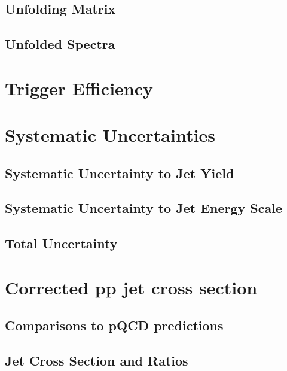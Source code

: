 \subsection{Unfolding Matrix}

\subsection{Unfolded Spectra}

\section{Trigger Efficiency}

\section{Systematic Uncertainties}

\subsection{Systematic Uncertainty to Jet Yield}

\subsection{Systematic Uncertainty to Jet Energy Scale}

\subsection{Total Uncertainty}

\section{Corrected pp jet cross section}

\subsection{Comparisons to pQCD predictions}

\subsection{Jet Cross Section and Ratios}
